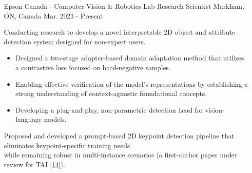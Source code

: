 

\vspace*{0.05cm}
\begin{cventries}

\cventry
{Epson Canada - Computer Vision \& Robotics Lab} %
{Research Scientist} %
{Markham, ON, Canada} %
{Mar. 2023 - Present} %
{ %
\begin{cvitems}
\item {Conducting research to develop a novel interpretable 2D object and attribute detection system designed for non-expert users.}
\begin{itemize}[label=$\cdot$,leftmargin=0.7em]
\item{Designed a two-stage adapter-based domain adaptation method that utilizes a contrastive loss focused on hard-negative samples.}
\item{Enabling effective verification of the model’s representations by establishing a strong understanding of context-agnostic foundational concepts.}
\item{Developing a plug-and-play, non-parametric detection head for vision-language models.}
\end{itemize}
\item {Proposed and developed a prompt-based 2D keypoint detection pipeline that eliminates keypoint-specific training needs \\while remaining robust in multi-instance scenarios (a first-author paper under review for TAI [\hyperlink{LAM:TAI}{14}]).}

\end{cvitems}}
\end{cventries}
